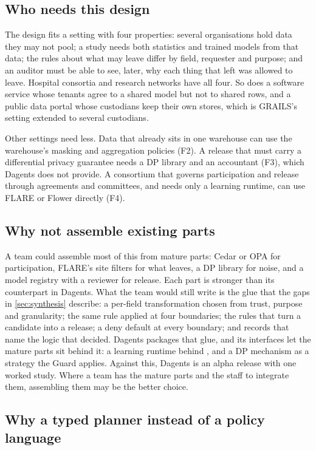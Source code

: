 \subsection{Who needs this design}

The design fits a setting with four properties: several organisations hold data
they may not pool; a study needs both statistics and trained models from that
data; the rules about what may leave differ by field, requester and purpose; and
an auditor must be able to see, later, why each thing that left was allowed to
leave. Hospital consortia and research networks have all four. So does a
software service whose tenants agree to a shared model but not to shared rows,
and a public data portal whose custodians keep their own stores, which is
GRAILS's setting extended to several custodians.

Other settings need less. Data that already sits in one warehouse can use the
warehouse's masking and aggregation policies (F2). A release that must carry a
differential privacy guarantee needs a DP library and an accountant (F3),
which Dagents does not provide. A consortium that governs participation and
release through agreements and committees, and needs only a learning runtime,
can use FLARE or Flower directly (F4).

\subsection{Why not assemble existing parts}

A team could assemble most of this from mature parts: Cedar or OPA for
participation, FLARE's site filters for what leaves, a DP library for noise, and
a model registry with a reviewer for release. Each part is stronger than its
counterpart in Dagents. What the team would still write is the glue that the
gaps in \cref{sec:synthesis} describe: a per-field transformation chosen from
trust, purpose and granularity; the same rule applied at four boundaries; the
rules that turn a candidate into a release; a deny default at every boundary;
and records that name the logic that decided. Dagents packages that glue, and
its interfaces let the mature parts sit behind it: a learning runtime behind
, and a DP mechanism as a strategy the Guard applies.
Against this, Dagents is an alpha release with one worked study. Where a team
has the mature parts and the staff to integrate them, assembling them may be the
better choice.

\subsection{Why a typed planner instead of a policy language}


